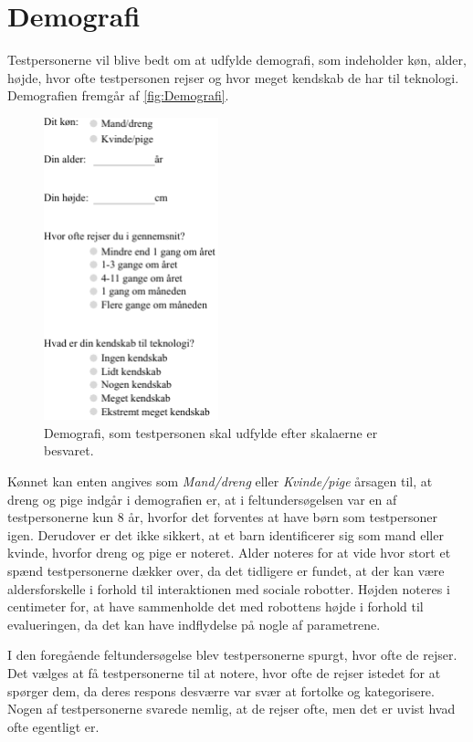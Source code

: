 \section{Demografi}
\label{Demografi}
%
Testpersonerne vil blive bedt om at udfylde demografi, som indeholder køn, alder, højde, hvor ofte testpersonen rejser og hvor meget kendskab de har til teknologi. Demografien fremgår af \autoref{fig:Demografi}.
%
\begin{figure}[H]
\centering
\includegraphics[width = 0.45\textwidth]{Figure/TestdesignEvaluering/Demografi} 
\caption{Demografi, som testpersonen skal udfylde efter skalaerne er besvaret.}
\label{fig:Demografi}
\end{figure}
\noindent
%
Kønnet kan enten angives som \textit{Mand/dreng} eller \textit{Kvinde/pige} årsagen til, at dreng og pige indgår i demografien er, at i feltundersøgelsen var en af testpersonerne kun 8 år, hvorfor det forventes at have børn som testpersoner igen. Derudover er det ikke sikkert, at et barn identificerer sig som mand eller kvinde, hvorfor dreng og pige er noteret. Alder noteres for at vide hvor stort et spænd testpersonerne dækker over, da det tidligere er fundet, at der kan være aldersforskelle i forhold til interaktionen med sociale robotter. Højden noteres i centimeter for, at have sammenholde det med robottens højde i forhold til evalueringen, da det kan have indflydelse på nogle af parametrene. 

I den foregående feltundersøgelse blev testpersonerne spurgt, hvor ofte de rejser. Det vælges at få testpersonerne til at notere, hvor ofte de rejser istedet for at spørger dem, da deres respons desværre var svær at fortolke og kategorisere. Nogen af testpersonerne svarede nemlig, at de rejser ofte, men det er uvist hvad ofte egentligt er.   

